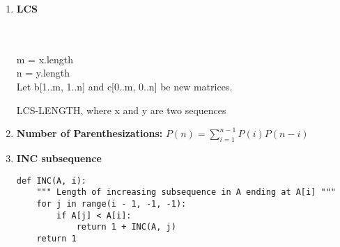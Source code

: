 \documentclass[11pt]{article}
\begin{document}
\begin{enumerate}
    \item \textbf{LCS} \\\\
    \begin{algorithm}[H]
        \Indm{}\\
        \Indp
            m = x.length \\
            n = y.length \\
            Let b[1..m, 1..n] and c[0..m, 0..n] be new matrices. \\
        \caption{LCS-LENGTH, where x and y are two sequences}
    \end{algorithm}
    
    \item \textbf{Number of Parenthesizations:} $P(n) = \sum_{i = 1}^{n-1}P(i)P(n-i)$
    
    \item \textbf{INC subsequence}
    \begin{verbatim}
def INC(A, i):
    """ Length of increasing subsequence in A ending at A[i] """
    for j in range(i - 1, -1, -1):
        if A[j] < A[i]:
            return 1 + INC(A, j)
    return 1
    \end{verbatim}
    

\end{enumerate}
\end{document}

